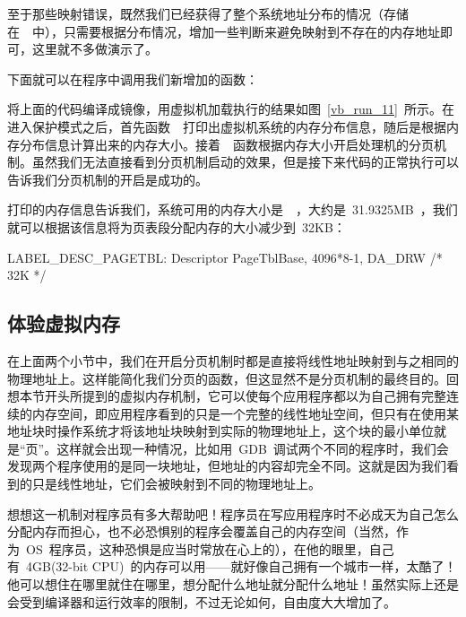 至于那些映射错误，既然我们已经获得了整个系统地址分布的情况（存储在~~中），只需要根据分布情况，增加一些判断来避免映射到不存在的内存地址即可，这里就不多做演示了。

下面就可以在程序中调用我们新增加的函数：


将上面的代码编译成镜像，用虚拟机加载执行的结果如图~\ref{vb_run_11}~所示。在进入保护模式之后，首先函数~~打印出虚拟机系统的内存分布信息，随后是根据内存分布信息计算出来的内存大小。接着~~函数根据内存大小开启处理机的分页机制。虽然我们无法直接看到分页机制启动的效果，但是接下来代码的正常执行可以告诉我们分页机制的开启是成功的。


打印的内存信息告诉我们，系统可用的内存大小是~~，大约是~31.9325MB~，我们就可以根据该信息将为页表段分配内存的大小减少到~32KB：

\begin{Command}
LABEL_DESC_PAGETBL: Descriptor PageTblBase,        4096*8-1, DA_DRW /* 32K */
\end{Command}

\subsection{体验虚拟内存}

在上面两个小节中，我们在开启分页机制时都是直接将线性地址映射到与之相同的物理地址上。这样能简化我们分页的函数，但这显然不是分页机制的最终目的。回想本节开头所提到的虚拟内存机制，它可以使每个应用程序都以为自己拥有完整连续的内存空间，即应用程序看到的只是一个完整的线性地址空间，但只有在使用某地址块时操作系统才将该地址块映射到实际的物理地址上，这个块的最小单位就是“页”。这样就会出现一种情况，比如用~GDB~调试两个不同的程序时，我们会发现两个程序使用的是同一块地址，但地址的内容却完全不同。这就是因为我们看到的只是线性地址，它们会被映射到不同的物理地址上。

想想这一机制对程序员有多大帮助吧！程序员在写应用程序时不必成天为自己怎么分配内存而担心，也不必恐惧别的程序会覆盖自己的内存空间（当然，作为~OS~程序员，这种恐惧是应当时常放在心上的），在他的眼里，自己有~4GB(32-bit CPU)~的内存可以用——就好像自己拥有一个城市一样，太酷了！他可以想住在哪里就住在哪里，想分配什么地址就分配什么地址！虽然实际上还是会受到编译器和运行效率的限制，不过无论如何，自由度大大增加了。

